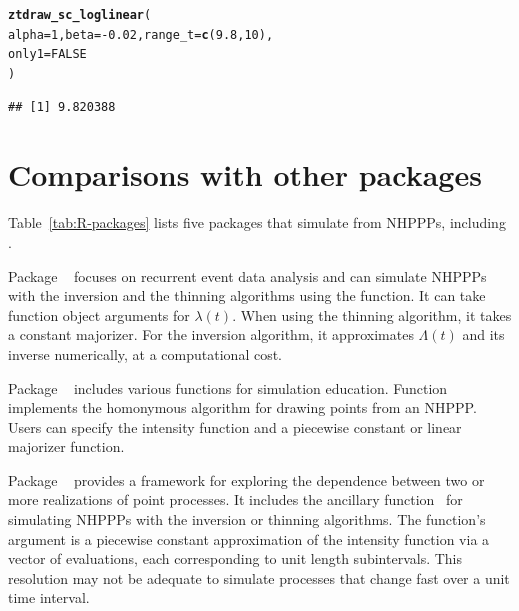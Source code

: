 \documentclass[article,nojss]{jss}\usepackage[]{graphicx}\usepackage[]{xcolor}
\makeatletter
\newcommand{\hlnum}[1]{\textcolor[rgb]{0.686,0.059,0.569}{#1}}%
\newcommand{\hlopt}[1]{\textcolor[rgb]{0,0,0}{#1}}%
\newcommand{\hlstd}[1]{\textcolor[rgb]{0.345,0.345,0.345}{#1}}%
\newcommand{\hlkwc}[1]{\textcolor[rgb]{0.333,0.667,0.333}{#1}}%
\newcommand{\hlkwd}[1]{\textcolor[rgb]{0.737,0.353,0.396}{\textbf{#1}}}%
\newenvironment{kframe}{%
 \def\at@end@of@kframe{}%
 \ifinner\ifhmode%
  \def\at@end@of@kframe{\end{minipage}}%
  \begin{minipage}{\columnwidth}%
 \fi\fi%
 \def\FrameCommand##1{\hskip\@totalleftmargin \hskip-\fboxsep
 \colorbox{shadecolor}{##1}\hskip-\fboxsep
     \hskip-\linewidth \hskip-\@totalleftmargin \hskip\columnwidth}%
 \MakeFramed {\advance\hsize-\width
   \@totalleftmargin\z@ \linewidth\hsize
   \@setminipage}}%
 {\par\unskip\endMakeFramed%
 \at@end@of@kframe}
\newenvironment{knitrout}{}{} %
\newcommand{\fct}[1]{\code{#1()}}
\makeatother
\begin{document}
\begin{knitrout}
\color{fgcolor}\begin{kframe}
\begin{alltt}
\hlkwd{ztdraw_sc_loglinear}\hlstd{(}
  \hlkwc{alpha} \hlstd{=} \hlnum{1}\hlstd{,} \hlkwc{beta} \hlstd{=} \hlopt{-}\hlnum{0.02}\hlstd{,} \hlkwc{range_t} \hlstd{=} \hlkwd{c}\hlstd{(}\hlnum{9.8}\hlstd{,} \hlnum{10}\hlstd{),}
  \hlkwc{only1} \hlstd{=} \hlnum{FALSE}
\hlstd{)}
\end{alltt}
\begin{verbatim}
## [1] 9.820388
\end{verbatim}
\end{kframe}
\end{knitrout}


\section[Comparisons with other R packages]{Comparisons with other  packages}\label{sec:other-R-packages}

Table~\ref{tab:R-packages} lists five  packages that simulate from NHPPPs, including .

Package ~\citep{reda-package} focuses on recurrent event data analysis and can simulate NHPPPs with the inversion and the thinning algorithms using the \fct{simEvent} function. It can take function object arguments for $\lambda(t)$. When using the thinning algorithm, it takes a constant majorizer. For the inversion algorithm, it approximates $\Lambda(t)$ and its inverse numerically, at a computational cost.

Package ~\citep{simEd-package} includes various functions for simulation education. Function \fct{thinning} implements the homonymous algorithm for drawing points from an NHPPP. Users can specify the intensity function and a piecewise constant or linear majorizer function.

Package ~\citep{IndTestPP-package} provides a framework for exploring the dependence between two or more realizations of point processes. It includes the ancillary function~\fct{simNHPc} for simulating NHPPPs with the inversion or thinning algorithms. The function's argument is a piecewise constant approximation of the intensity function via a vector of evaluations, each corresponding to unit length subintervals. This resolution may not be adequate to simulate processes that change fast over a unit time interval.
\end{document}
